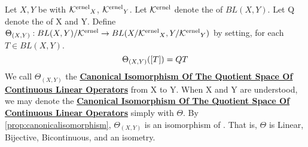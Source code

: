 \label{def:canonicalisomorphism}
\newcommand{\CanonicalIso}[0]{\textbf{\hyperref[def:canonicalisomorphism]{Canonical Isomorphism Of The Quotient Space Of Continuous Linear Operators}}\xspace}

\begin{df}
    Let $X,Y$ be \SeminormedSpaces
    with \SeminormKernels $\textbf{\ensuremath{\mathcal{K}\rm^{ernel}}}_X$, $\textbf{\ensuremath{\mathcal{K}\rm^{ernel}}}_Y$.
    Let $\textbf{\ensuremath{\mathcal{K}\rm^{ernel}}}$ denote the \SeminormKernel of $BL(X,Y)$. 
    Let Q denote the \OperatorQuotientMap of X and Y.
    Define $\Theta_{(X,Y)}:BL(X,Y)/\textbf{\ensuremath{\mathcal{K}\rm^{ernel}}} \to BL(X/\textbf{\ensuremath{\mathcal{K}\rm^{ernel}}}_X, Y/\textbf{\ensuremath{\mathcal{K}\rm^{ernel}}}_Y)$ by 
    setting, for each $T \in BL(X,Y)$. 
    \begin{equation}
        \Theta_{(X,Y)}(\left[ T \right]) = QT
    \end{equation}
    We call $\Theta_{(X,Y)}$ the \CanonicalIso from X to Y. 
    When X and Y are understood, we may denote the
    \CanonicalIso simply with $\Theta$. 
    By \ref{prop:canonicalisomorphism}, $\Theta_{(X,Y)}$
    is an isomorphism of \NormedSpaces.
    That is, $\Theta$ is Linear, Bijective, Bicontinuous, and an isometry. 
\end{df}



